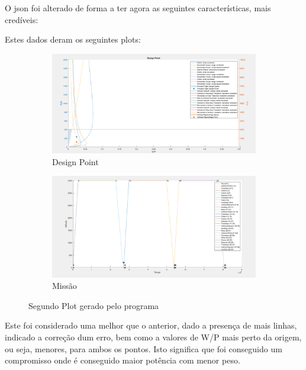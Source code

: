 O json foi alterado de forma a ter agora as seguintes características, mais credíveis:\par

Estes dados deram os seguintes plots:\par
\FloatBarrier
\begin{figure}[h]
    \centering
    \begin{subfigure}[h]{0.70\textwidth}
        \includegraphics[width=\textwidth]{Imagens/secondplot_designpoint.PNG}
        \caption{Design Point}
        \label{}
    \end{subfigure}
    \hfill
    \begin{subfigure}[h]{0.70\textwidth}
        \includegraphics[width=\textwidth]{Imagens/secondplot_misson.PNG}
        \caption{Missão}
        \label{}
    \end{subfigure}
    \caption{Segundo Plot gerado pelo programa}
    \label{firstplot}
\end{figure}
\FloatBarrier
Este foi considerado uma melhor que o anterior, dado a presença de mais linhas, indicado a correção dum erro, bem como a valores de W/P mais perto da origem, ou seja, menores, para ambos os pontos. Isto significa que foi conseguido um compromisso onde é conseguido maior potência com menor peso.\par
